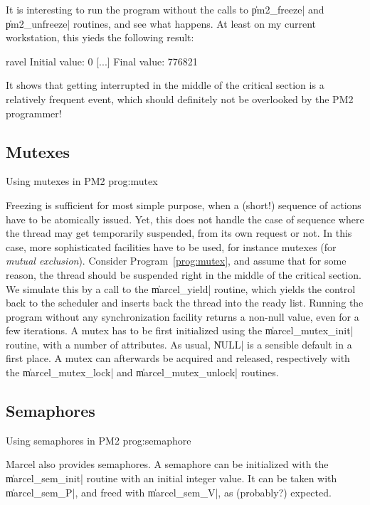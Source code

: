 It is interesting to run the program without the calls to
\|pm2_freeze| and \|pm2_unfreeze| routines, and see what happens.
At least on my current workstation, this yieds the following result:
\begin{shell}
ravel%
Initial value: 0
[...]
Final value: 776821
\end{shell}
It shows that getting interrupted in the middle of the critical section
is a relatively frequent event, which should definitely not be
overlooked by the PM2 programmer! 

\subsection{Mutexes}
\label{sec:mutex}

 {Using mutexes in PM2}
{prog:mutex}

Freezing is sufficient for most simple purpose, when a (short!)
sequence of actions have to be atomically issued. Yet, this does not
handle the case of sequence where the thread may get temporarily
suspended, from its own request or not. In this case, more
sophisticated facilities have to be used, for instance mutexes (for
\emph{mutual exclusion}). Consider Program~\ref{prog:mutex}, and
assume that for some reason, the thread should be suspended right in
the middle of the critical section. We simulate this by a call to the
\|marcel_yield| routine, which yields the control back to the
scheduler and inserts back the thread into the ready list. Running the
program without any synchronization facility returns a non-null value,
even for a few iterations. A mutex has to be first initialized using
the \|marcel_mutex_init| routine, with a number of attributes. As
usual, \|NULL| is a sensible default in a first place.  A mutex can
afterwards be acquired and released, respectively with the
\|marcel_mutex_lock| and \|marcel_mutex_unlock| routines.

\subsection{Semaphores}

 {Using semaphores in PM2}
{prog:semaphore}

Marcel also provides semaphores. A semaphore can be initialized with
the \|marcel_sem_init| routine with an initial integer value. It can
be taken with \|marcel_sem_P|, and freed with \|marcel_sem_V|, as
(probably?) expected.

